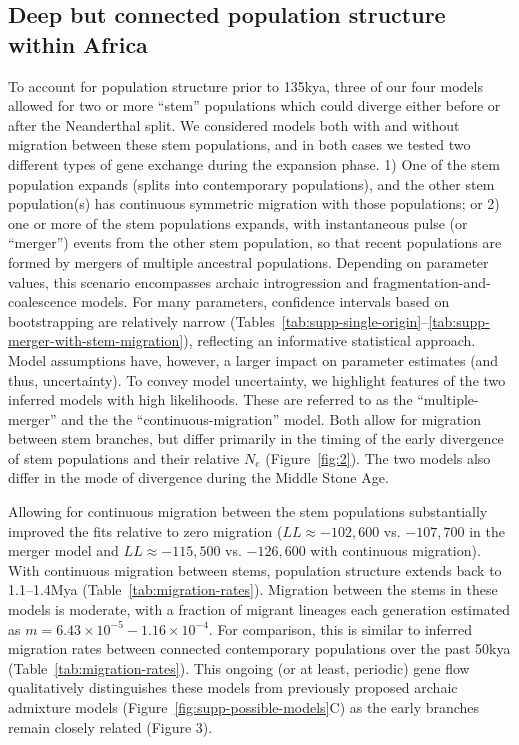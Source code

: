 \documentclass{article}
\begin{document}
\subsection*{Deep but connected population structure within Africa}

To account for population structure prior to 135kya, three of our four models allowed for two or more
“stem” populations which could diverge either before or after the Neanderthal
split. We considered models both with and without migration between these stem
populations, and in both cases we tested two different types of gene exchange
during the expansion phase. 1) One of the stem population expands (splits into
contemporary populations), and the other stem population(s) has continuous
symmetric migration with those populations; or 2) one or more of the stem
populations expands, with instantaneous pulse (or “merger”) events from the
other stem population, so that recent populations are formed by mergers of multiple ancestral populations. Depending on parameter values,
this scenario encompasses archaic introgression and
fragmentation-and-coalescence models. For many parameters, confidence intervals based on bootstrapping are relatively narrow
(Tables~\ref{tab:supp-single-origin}--\ref{tab:supp-merger-with-stem-migration}),
reflecting an informative statistical approach. Model assumptions
have, however, a larger impact on parameter estimates (and thus, uncertainty). To convey model uncertainty, we
highlight features of the two inferred models with high likelihoods. These are referred to as the
“multiple-merger” and the the “continuous-migration” model. Both allow for
migration between stem branches, but differ primarily in the timing of the
early divergence of stem populations and their relative $N_e$
(Figure~\ref{fig:2}). The two models also differ in the mode of divergence
during the Middle Stone Age.

Allowing for continuous migration between the stem populations substantially
improved the fits relative to zero migration ($LL \approx -102,600$ vs.
$-107,700$ in the merger model and $LL \approx -115,500$ vs. $-126,600$ with
continuous migration). With continuous migration between stems, population
structure extends back to 1.1--1.4Mya (Table~\ref{tab:migration-rates}).
Migration between the stems in these models is moderate, with a fraction of
migrant lineages each generation estimated as
$m=6.43\times10^{-5}-1.16\times10^{-4}$. For comparison, this is similar
to inferred migration rates between connected contemporary populations over the
past 50kya (Table~\ref{tab:migration-rates}). This ongoing (or at least,
periodic) gene flow qualitatively distinguishes these models from previously
proposed archaic admixture models (Figure~\ref{fig:supp-possible-models}C) as
the early branches remain closely related (Figure 3). 
\end{document}
